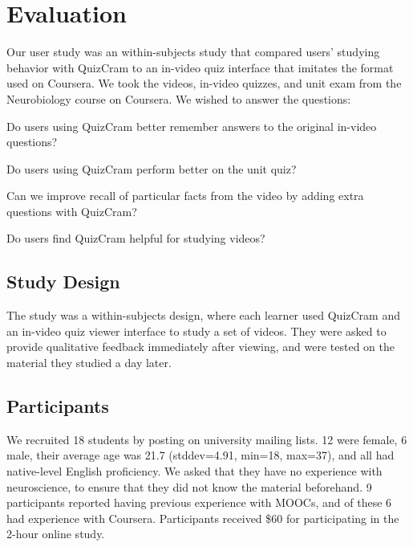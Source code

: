 \documentclass{chi-ext}
\begin{document}
\section{Evaluation}
Our user study was an within-subjects study that compared users' studying behavior with QuizCram to an in-video quiz interface that imitates the format used on Coursera. We took the videos, in-video quizzes, and unit exam from the Neurobiology course on Coursera. We wished to answer the questions:

\begin{compactitem}
\item Do users using QuizCram better remember answers to the original in-video questions?
\item Do users using QuizCram perform better on the unit quiz?
\item Can we improve recall of particular facts from the video by adding extra questions with QuizCram?
\item Do users find QuizCram helpful for studying videos?
\end{compactitem}

\subsection{Study Design}

The study was a within-subjects design, where each learner used QuizCram and an in-video quiz viewer interface to study a set of videos. They were asked to provide qualitative feedback immediately after viewing, and were tested on the material they studied a day later.

\subsection{Participants}

We recruited 18  students by posting on university mailing lists. 12 were female, 6 male, their average age was 21.7 (stddev=4.91, min=18, max=37), and all had native-level English proficiency. We asked that they have no experience with neuroscience, to ensure that they did not know the material beforehand.  9 participants reported having previous experience with MOOCs, and of these 6 had experience with Coursera. Participants received \$60 for participating in the 2-hour online study.
\end{document}
